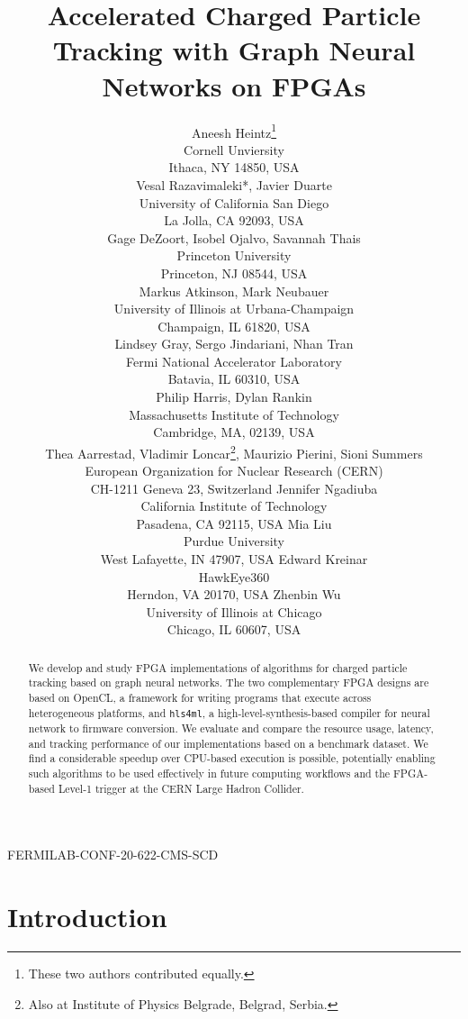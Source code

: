 \documentclass{article}
\title{Accelerated Charged Particle Tracking with Graph Neural Networks on FPGAs}
\author{
  Aneesh Heintz\thanks{These two authors contributed equally.} \\
  Cornell Unviersity \\
  Ithaca, NY 14850, USA\\
  \And
  Vesal Razavimaleki*, Javier Duarte\\
  University of California San Diego\\
  La Jolla, CA 92093, USA \\
  \And
  Gage DeZoort, Isobel Ojalvo, Savannah Thais \\
  Princeton University \\
  Princeton, NJ 08544, USA \\
  \And
  Markus Atkinson, Mark Neubauer\\
  University of Illinois at Urbana-Champaign \\
  Champaign, IL 61820, USA\\
  \And
  Lindsey Gray, Sergo Jindariani, Nhan Tran \\
  Fermi National Accelerator Laboratory \\
  Batavia, IL 60310, USA\\
  \And
  Philip Harris, Dylan Rankin \\
  Massachusetts Institute of Technology \\
  Cambridge, MA, 02139, USA\\
  \And
  Thea Aarrestad, Vladimir Loncar\thanks{Also at Institute of Physics Belgrade, Belgrad, Serbia.}, Maurizio Pierini, Sioni Summers \\
  European Organization for Nuclear Research (CERN) \\
  CH-1211 Geneva 23, Switzerland
  \And
  Jennifer Ngadiuba \\
  California Institute of Technology \\
  Pasadena, CA 92115, USA
  \And
  Mia Liu \\
  Purdue University \\
  West Lafayette, IN 47907, USA
  \And
  Edward Kreinar\\
  HawkEye360\\
  Herndon, VA 20170, USA
  \And
  Zhenbin Wu\\
  University of Illinois at Chicago\\
  Chicago, IL 60607, USA
}
\newcommand{\hlsfml}{\texttt{hls4ml}\xspace}
\begin{document}
\begin{flushright}
FERMILAB-CONF-20-622-CMS-SCD
\end{flushright}

\maketitle

\begin{abstract}
We develop and study FPGA implementations of algorithms for charged particle tracking based on graph neural networks. 
The two complementary FPGA designs are based on OpenCL, a framework for writing programs that execute across heterogeneous platforms, and \hlsfml, a high-level-synthesis-based compiler for neural network to firmware conversion.
We evaluate and compare the resource usage, latency, and tracking performance of our implementations based on a benchmark dataset.
We find a considerable speedup over CPU-based execution is possible, potentially enabling such algorithms to be used effectively in future computing workflows and the FPGA-based Level-1 trigger at the CERN Large Hadron Collider.
\end{abstract}

\section{Introduction}
\end{document}
